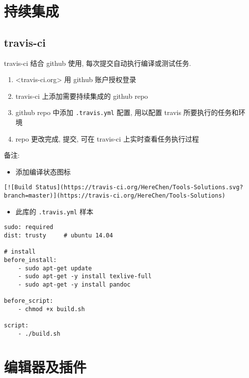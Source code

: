 \section{持续集成}\label{ux6301ux7eedux96c6ux6210}

\subsection{travis-ci}\label{travis-ci}

travis-ci 结合 github 使用, 每次提交自动执行编译或测试任务.

\begin{enumerate}
\def\labelenumi{\arabic{enumi}.}
\tightlist
\item
  \textless{}travis-ci.org\textgreater{} 用 github 账户授权登录
\item
  travis-ci 上添加需要持续集成的 github repo
\item
  github repo 中添加 \texttt{.travis.yml} 配置, 用以配置 travis
  所要执行的任务和环境
\item
  repo 更改完成, 提交, 可在 travis-ci 上实时查看任务执行过程
\end{enumerate}

备注:

\begin{itemize}
\tightlist
\item
  添加编译状态图标
\end{itemize}

\begin{verbatim}
[![Build Status](https://travis-ci.org/HereChen/Tools-Solutions.svg?branch=master)](https://travis-ci.org/HereChen/Tools-Solutions)
\end{verbatim}

\begin{itemize}
\tightlist
\item
  此库的 \texttt{.travis.yml} 样本
\end{itemize}

\begin{verbatim}
sudo: required
dist: trusty     # ubuntu 14.04

# install
before_install:
    - sudo apt-get update
    - sudo apt-get -y install texlive-full
    - sudo apt-get -y install pandoc

before_script:
    - chmod +x build.sh

script:
    - ./build.sh
\end{verbatim}

\section{编辑器及插件}\label{ux7f16ux8f91ux5668ux53caux63d2ux4ef6}

